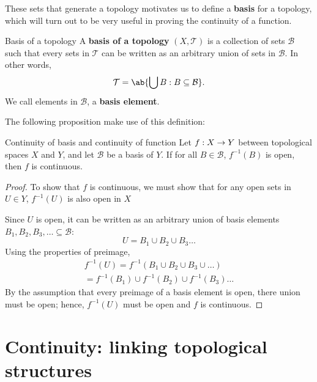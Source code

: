 These sets that generate a topology motivates us to define a \textbf{basis} for a
topology, which will turn out to be very useful in proving the continuity of a function.

\begin{df}{Basis of a topology}{}
  A \textbf{basis of a topology} \((X, \mathcal{T})\) is a collection of sets \(\mathcal{B}\)
  such that every sets in \(\mathcal{T}\) can be written as an arbitrary union of sets
  in \(\mathcal{B}\). In other words,
  \begin{equation}
    \mathcal{T} = \ab\{\bigcup B : B \subseteq \mathcal{B}\}.
  \end{equation}
  We call elements in \(\mathcal{B}\), a \textbf{basis element}. 
\end{df}

The following proposition make use of this definition:
\begin{lemma}{Continuity of basis and continuity of function}{}
  Let \(f: X \rightarrow Y\) between topological spaces \(X\) and \(Y\), and let \(\mathcal{B}\) be a
  basis of \(Y\). If for all \(B \in \mathcal{B}\), \(f^{-1}(B)\) is open, then \(f\) is continuous.
\end{lemma}
\begin{proof}
  To show that \(f\) is continuous, we must show that for any open sets in \(U \in Y\),
  \(f^{-1}(U)\) is also open in \(X\)

  Since \(U\) is open, it can be written as an arbitrary union of basis elements
  \(B_1, B_2, B_3, \dots \subseteq \mathcal{B}\):
  \begin{equation}
    U = B_1 \cup B_2 \cup B_3 \dots
  \end{equation}
  Using the properties of preimage,
  \begin{multline}
    f^{-1}(U) = f^{-1}(B_1 \cup B_2 \cup B_3 \cup \dots)  \\
    = f^{-1}(B_1) \cup f^{-1}(B_2) \cup f^{-1}(B_3) \dots
  \end{multline}
  By the assumption that every preimage of a basis element is open, there union must
  be open; hence, \(f^{-1}(U)\) must be open and \(f\) is continuous.
\end{proof}

\section{Continuity: linking topological structures}

